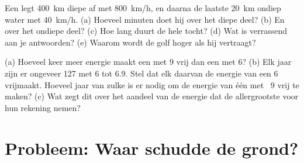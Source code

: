 \begin{exercise}[$\star\star\star$]\label{exo:g7:earthquakes:11}
Een  legt \qty{400}{km} diepe  af met \qty{800}{km/h}, en
daarna de laatste \qty{20}{km} ondiep water met \qty{40}{km/h}. (a) Hoeveel
minuten doet hij over het diepe deel? (b) En over het ondiepe deel? (c) Hoe
lang duurt de hele tocht? (d) Wat is verrassend aan je antwoorden? (e)
Waarom wordt de golf hoger als hij vertraagt?
\end{exercise}

\begin{exercise}[$\star\star\star$]\label{exo:g7:earthquakes:12}
(a) Hoeveel keer meer energie maakt een  met  9 vrij dan
een met  6? (b) Elk jaar zijn er ongeveer 127  met
 6 tot 6.9. Stel dat elk daarvan de energie van een  6
vrijmaakt. Hoeveel jaar van zulke  is er nodig om de energie
van één  met ~9 vrij te maken? (c) Wat zegt dit over het
aandeel van de energie dat de allergrootste  voor hun rekening
nemen?
\end{exercise}

\section{Probleem: Waar schudde de grond?}


